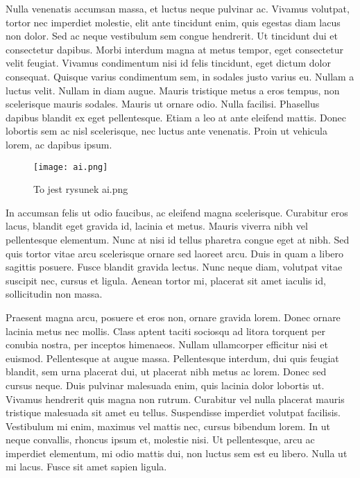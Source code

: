 \documentclass[12pt]{article}
\begin{document}
Nulla venenatis accumsan massa, et luctus neque pulvinar ac. Vivamus volutpat, tortor nec imperdiet molestie, elit ante tincidunt enim, quis egestas diam lacus non dolor. Sed ac neque vestibulum sem congue hendrerit. Ut tincidunt dui et consectetur dapibus. Morbi interdum magna at metus tempor, eget consectetur velit feugiat. Vivamus condimentum nisi id felis tincidunt, eget dictum dolor consequat. Quisque varius condimentum sem, in sodales justo varius eu. Nullam a luctus velit. Nullam in diam augue. Mauris tristique metus a eros tempus, non scelerisque mauris sodales. Mauris ut ornare odio. Nulla facilisi. Phasellus dapibus blandit ex eget pellentesque. Etiam a leo at ante eleifend mattis. Donec lobortis sem ac nisl scelerisque, nec luctus ante venenatis. Proin ut vehicula lorem, ac dapibus ipsum.

\begin{figure}[h]
    \centering
    
    \texttt{[image: ai.png]}
    \caption{To jest rysunek ai.png}
    \label{fig:ai}
\end{figure}

In accumsan felis ut odio faucibus, ac eleifend magna scelerisque. Curabitur eros lacus, blandit eget gravida id, lacinia et metus. Mauris viverra nibh vel pellentesque elementum. Nunc at nisi id tellus pharetra congue eget at nibh. Sed quis tortor vitae arcu scelerisque ornare sed laoreet arcu. Duis in quam a libero sagittis posuere. Fusce blandit gravida lectus. Nunc neque diam, volutpat vitae suscipit nec, cursus et ligula. Aenean tortor mi, placerat sit amet iaculis id, sollicitudin non massa.

Praesent magna arcu, posuere et eros non, ornare gravida lorem. Donec ornare lacinia metus nec mollis. Class aptent taciti sociosqu ad litora torquent per conubia nostra, per inceptos himenaeos. Nullam ullamcorper efficitur nisi et euismod. Pellentesque at augue massa. Pellentesque interdum, dui quis feugiat blandit, sem urna placerat dui, ut placerat nibh metus ac lorem. Donec sed cursus neque. Duis pulvinar malesuada enim, quis lacinia dolor lobortis ut. Vivamus hendrerit quis magna non rutrum. Curabitur vel nulla placerat mauris tristique malesuada sit amet eu tellus. Suspendisse imperdiet volutpat facilisis. Vestibulum mi enim, maximus vel mattis nec, cursus bibendum lorem. In ut neque convallis, rhoncus ipsum et, molestie nisi. Ut pellentesque, arcu ac imperdiet elementum, mi odio mattis dui, non luctus sem est eu libero. Nulla ut mi lacus. Fusce sit amet sapien ligula.
\end{document}
